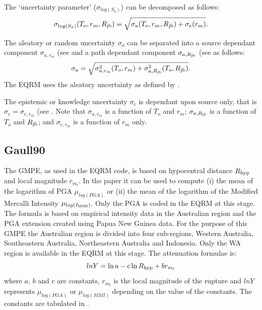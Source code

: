 The `uncertainty parameter' ($\sigma_{log(S_a)}$) can be
decomposed as follows:
\begin{equation}
 \sigma_{log(S_a)}(T_o,r_m,\Rjb) =
 \sqrt{\sigma_a(T_o,r_m,\Rjb)+\sigma_e(r_m)}.
\end{equation}

The aleatory or random uncertainty $\sigma_a$ can be separated into
a source dependant component $\sigma_{a,r_m}$ (see \citet[Table
3]{dr_Toro97a} and a path dependant component $\sigma_{a,\Rjb}$ (see
\citet[Table 4]{dr_Toro97a} as follows:
\begin{equation}
\label{eq:attn-toro-aleat} \sigma_a =
\sqrt{\sigma_{a,r_m}^2(T_o,r_m) + \sigma_{a,\Rjb}^2(T_o,\Rjb)}.
\end{equation}
The EQRM uses the aleatory uncertainty as defined by
.

The epistemic or knowledge uncertainty $\sigma_e$ is dependant upon
source only, that is \mbox{$\sigma_e =\sigma_{e,r_m}$} (see
\citet[Page 48]{dr_Toro97a}. Note that $\sigma_{a,r_m}$ is a
function of $T_o$ and $r_m$; $\sigma_{a,\Rjb}$ is a function of
$T_o$ and $\Rjb$; and $\sigma_{e,r_m}$ is a function of $r_m$ only.

\subsection{Gaull90}
\label{attn:atten-formula-Gaull}

The \citet{dr_Gaull90a} GMPE, as used in the EQRM code, is based on
hypocentral distance $\Rhyp$ and local magnitude $r_{m_l}$. In the
paper it can be used to compute (i) the mean of the logarithm of PGA
$\mu_{log(PGA)}$ or (ii) the mean of the logarithm of the Modified
Mercalli Intensity $\mu_{log(\Imm)}$. Only the PGA is coded in the
EQRM at this stage. The formula is based on empirical intensity data
in the Australian region and the PGA extension created using Papua
New Guinea data. For the purpose of this GMPE the Australian region
is divided into four sub-regions, Western Australia, Southeastern
Australia, Northeastern Australia and Indonesia. Only the WA region
is available in the EQRM at this stage. The attenuation formulae is:
\begin{equation}
lnY = \ln a-c\ln \Rhyp + br_{m_l}
\end{equation}
where $a$, $b$ and $c$ are constants, $r_{m_l}$ is the local
magnitude of the rupture and $lnY$ represents $\mu_{log(PGA)}$ or
$\mu_{log(MMI)}$ depending on the value of the constants. The
constants are tabulated in \citet[Table 4]{dr_Gaull90a}.

